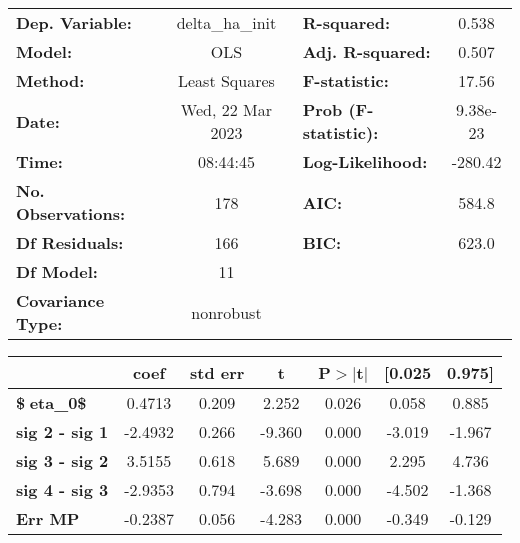\begin{center}
\begin{tabular}{lclc}
\toprule
\textbf{Dep. Variable:}    & delta\_ha\_init  & \textbf{  R-squared:         } &    0.538  \\
\textbf{Model:}            &       OLS        & \textbf{  Adj. R-squared:    } &    0.507  \\
\textbf{Method:}           &  Least Squares   & \textbf{  F-statistic:       } &    17.56  \\
\textbf{Date:}             & Wed, 22 Mar 2023 & \textbf{  Prob (F-statistic):} & 9.38e-23  \\
\textbf{Time:}             &     08:44:45     & \textbf{  Log-Likelihood:    } &  -280.42  \\
\textbf{No. Observations:} &         178      & \textbf{  AIC:               } &    584.8  \\
\textbf{Df Residuals:}     &         166      & \textbf{  BIC:               } &    623.0  \\
\textbf{Df Model:}         &          11      & \textbf{                     } &           \\
\textbf{Covariance Type:}  &    nonrobust     & \textbf{                     } &           \\
\bottomrule
\end{tabular}
\end{center}\begin{center}
\begin{tabular}{lcccccc}
\toprule
                                & \textbf{coef} & \textbf{std err} & \textbf{t} & \textbf{P$> |$t$|$} & \textbf{[0.025} & \textbf{0.975]}  \\
\midrule
\textbf{\$eta\_{0}\$}          &       0.4713  &        0.209     &     2.252  &         0.026        &        0.058    &        0.885     \\
\textbf{sig 2 - sig 1}          &      -2.4932  &        0.266     &    -9.360  &         0.000        &       -3.019    &       -1.967     \\
\textbf{sig 3 - sig 2}          &       3.5155  &        0.618     &     5.689  &         0.000        &        2.295    &        4.736     \\
\textbf{sig 4 - sig 3}          &      -2.9353  &        0.794     &    -3.698  &         0.000        &       -4.502    &       -1.368     \\
\textbf{Err MP}                 &      -0.2387  &        0.056     &    -4.283  &         0.000        &       -0.349    &       -0.129     \\

\end{tabular}
\end{center}
